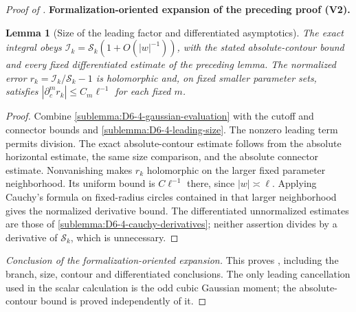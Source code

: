 \documentclass[11pt]{article}
\newtheorem{lemma}[theorem]{Lemma}
\newcommand{\formalisationparentid}{X}
\newenvironment{formalisationaddition}[1]{\par\medskip\begingroup\color{blue}\def\formalisationparentid{#1}\setcounter{formalizationsublemma}{0}\let\lemma\formalizationsublemma\let\endlemma\endformalizationsublemma
  \def\Eo{\mathcal E_h^\circ}\def\EE{\mathcal E_h}\def\phio{\phi_h^\circ}\def\phih{\phi_h}\def\Ho{H_h^{\rm atom}(v^\circ)}\def\Ha{H_h^{\rm atom}}\def\HL{H_h^{L}}\def\Dh{D_h}\def\Log{\operatorname{Log}}\def\ellh{\ell_h}\def\Gp{G_{p,h}}\def\Ast{A_{*,h}}\def\ahat{\widehat{\mathfrak a}_h}\def\ah{\mathfrak a_h}\def\rh{\widehat\rho_h}\def\deltah{\widehat\delta_h}\def\oldref##1{\textup{(##1)}}\def\interface##1{\par\noindent\textit{Analytical interface used here.} ##1\par}\def\finish{\par\noindent\textit{Conclusion of the formalization-oriented expansion.} }\par\noindent\textbf{Formalization-oriented expansion of the preceding proof (V2).}\par\smallskip
}{\par\endgroup\medskip
}
\begin{document}
\begin{proof}[Proof of ]
\begin{formalisationaddition}{D-T6.4}
\begin{lemma}[Size of the leading factor and differentiated asymptotics]\label{sublemma:D6-4-size-derivatives}
The exact integral obeys $\mathcal I_k=\mathcal S_k(1+O(|w|^{-1}))$, with the stated
absolute-contour bound and every fixed differentiated estimate of the
preceding lemma. The normalized error $r_k=\mathcal I_k/\mathcal S_k-1$ is holomorphic
and, on fixed smaller parameter sets, satisfies
$|\partial_c^m r_k|\le C_m\ell^{-1}$ for each fixed $m$.
\end{lemma}
\begin{proof}
Combine \ref{sublemma:D6-4-gaussian-evaluation} with the cutoff and
connector bounds and \ref{sublemma:D6-4-leading-size}.
The nonzero leading term permits division. The exact absolute-contour
estimate follows from the absolute horizontal estimate, the same size
comparison, and the absolute connector estimate.
Nonvanishing makes $r_k$ holomorphic on the larger fixed parameter
neighborhood. Its uniform bound is $C\ell^{-1}$ there, since
$|w|\asymp\ell$. Applying Cauchy's formula on fixed-radius circles
contained in that larger neighborhood gives the normalized derivative
bound. The differentiated unnormalized estimates are those of
\ref{sublemma:D6-4-cauchy-derivatives}; neither assertion divides by
a derivative of $\mathcal S_k$, which is unnecessary.
\end{proof}
\finish This proves , including the branch,
size, contour and differentiated conclusions. The only leading
cancellation used in the scalar calculation is the odd cubic Gaussian
moment; the absolute-contour bound is proved independently of it.
\end{formalisationaddition}

\end{proof}
\end{document}
